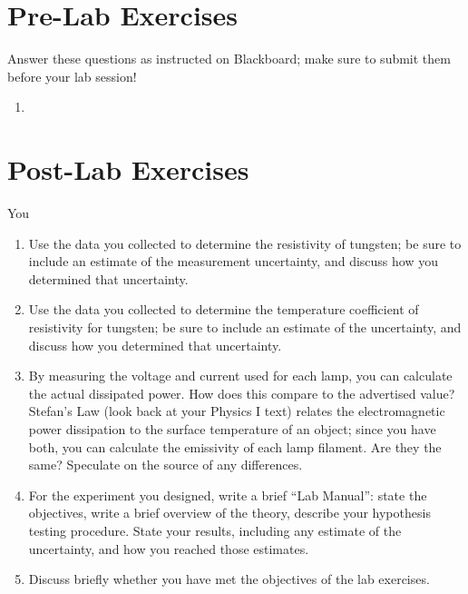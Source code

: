 \documentclass[12pt]{article}
\begin{document}
\newpage

\section*{Pre-Lab Exercises}

Answer these questions as instructed on Blackboard; make sure to
submit them before your lab session!

\begin{enumerate}
\item 
\end{enumerate}

\newpage

\section*{Post-Lab Exercises}

You 

\begin{enumerate}
\item Use the data you collected to determine the resistivity of
  tungsten; be sure to include an estimate of the measurement
  uncertainty, and discuss how you determined that uncertainty.
\item Use the data you collected to determine the temperature
  coefficient of resistivity for tungsten; be sure to include an
  estimate of the uncertainty, and discuss how you determined that
  uncertainty.
\item By measuring the voltage and current used for each lamp, you can
  calculate the actual dissipated power.  How does this compare to the
  advertised value?  Stefan's Law (look back at your Physics I text)
  relates the electromagnetic power dissipation to the surface
  temperature of an object; since you have both, you can calculate the
  emissivity of each lamp filament.  Are they the same?  Speculate on
  the source of any differences.
\item For the experiment you designed, write a brief ``Lab Manual'':
  state the objectives, write a brief overview of the theory, describe
  your hypothesis testing procedure.  State your results, including
  any estimate of the uncertainty, and how you reached those
  estimates.  
\item Discuss briefly whether you have met the objectives of the lab
  exercises. 
\end{enumerate}
\end{document}

